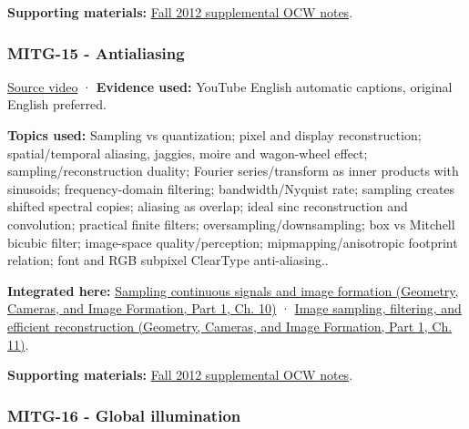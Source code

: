 \textbf{Supporting materials:} \href{https://ocw.mit.edu/courses/6-837-computer-graphics-fall-2012/pages/lecture-notes/}{Fall 2012 supplemental OCW notes}.

\subsubsection{MITG-15 - Antialiasing}\label{04-visual-computing-ii-ch036-mitg-15---antialiasing}

\hypertarget{04-visual-computing-ii-ch036-mitg-15---antialiasing}{}

\href{https://www.youtube.com/watch?v=eHXDosme1eo}{Source video} · \textbf{Evidence used:} YouTube English automatic captions, original English preferred.

\textbf{Topics used:} Sampling vs quantization; pixel and display reconstruction; spatial/temporal aliasing, jaggies, moire and wagon-wheel effect; sampling/reconstruction duality; Fourier series/transform as inner products with sinusoids; frequency-domain filtering; bandwidth/Nyquist rate; sampling creates shifted spectral copies; aliasing as overlap; ideal sinc reconstruction and convolution; practical finite filters; oversampling/downsampling; box vs Mitchell bicubic filter; image-space quality/perception; mipmapping/anisotropic footprint relation; font and RGB subpixel ClearType anti-aliasing..

\textbf{Integrated here:} \href{../03-Geometry-Cameras-and-Image-Formation-P01/main.pdf\#03-visual-computing-i-ch003-sampling-continuous-signals-and-image-formation}{Sampling continuous signals and image formation (Geometry, Cameras, and Image Formation, Part 1, Ch. 10)} · \href{../03-Geometry-Cameras-and-Image-Formation-P01/main.pdf\#03-visual-computing-i-ch004-image-sampling-filtering-and-efficient-reconstruction}{Image sampling, filtering, and efficient reconstruction (Geometry, Cameras, and Image Formation, Part 1, Ch. 11)}.

\textbf{Supporting materials:} \href{https://ocw.mit.edu/courses/6-837-computer-graphics-fall-2012/pages/lecture-notes/}{Fall 2012 supplemental OCW notes}.

\subsubsection{MITG-16 - Global illumination}\label{04-visual-computing-ii-ch036-mitg-16---global-illumination}

\hypertarget{04-visual-computing-ii-ch036-mitg-16---global-illumination}{}

